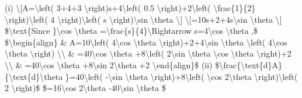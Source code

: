 \item {}

(i) \textbackslash{[}A=\textbackslash left( 3+4+3 \textbackslash right)s+4\textbackslash left(
0.5 \textbackslash right)+2\textbackslash left( \textbackslash frac\{1\}\{2\}
\textbackslash right)\textbackslash left( 4 \textbackslash right)\textbackslash left(
s \textbackslash right)\textbackslash sin \textbackslash theta
\textbackslash{]} \textbackslash{[}=10s+2+4s\textbackslash sin
\textbackslash theta \textbackslash{]} \$\textbackslash text\{Since
\}\textbackslash cos \textbackslash theta =\textbackslash frac\{s\}\{4\}\textbackslash Rightarrow
s=4\textbackslash cos \textbackslash theta ,\$ \$\textbackslash begin\{align\}
\& A=10\textbackslash left( 4\textbackslash cos \textbackslash theta
\textbackslash right)+2+4\textbackslash sin \textbackslash theta
\textbackslash left( 4\textbackslash cos \textbackslash theta \textbackslash right)
\textbackslash\textbackslash{} \& =40\textbackslash cos \textbackslash theta
+8\textbackslash left( 2\textbackslash sin \textbackslash theta
\textbackslash cos \textbackslash theta \textbackslash right)+2
\textbackslash\textbackslash{} \& =40\textbackslash cos \textbackslash theta
+8\textbackslash sin 2\textbackslash theta +2 \textbackslash end\{align\}\$
(ii) \$\textbackslash frac\{\textbackslash text\{d\}A\}\{\textbackslash text\{d\}\textbackslash theta
\}=40\textbackslash left( -\textbackslash sin \textbackslash theta
\textbackslash right)+8\textbackslash left( \textbackslash cos
2\textbackslash theta \textbackslash right)\textbackslash left(
2 \textbackslash right)\$ \$=16\textbackslash cos 2\textbackslash theta
-40\textbackslash sin \textbackslash theta \$


